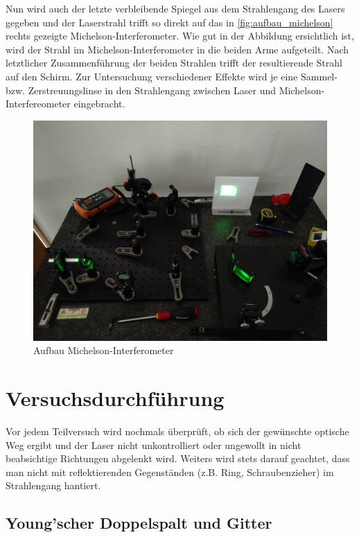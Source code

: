 \documentclass[ngerman]{scrartcl}
\begin{document}
Nun wird auch der letzte verbleibende Spiegel aus dem Strahlengang des Lasers gegeben und der Laserstrahl trifft so direkt auf das in \autoref{fig:aufbau_michelson} rechts gezeigte Michelson-Interferometer. Wie gut in der Abbildung ersichtlich ist, wird der Strahl im Michelson-Interferometer in die beiden Arme aufgeteilt. Nach letztlicher Zusammenführung der beiden Strahlen trifft der resultierende Strahl auf den Schirm.
Zur Untersuchung verschiedener Effekte wird je eine Sammel- bzw. Zerstreuungslinse in den Strahlengang zwischen Laser und Michelson-Interfereometer eingebracht.
%
\begin{figure}[H]
    \centering
    \begin{samepage}
        \includegraphics[width=0.7\linewidth]{fig/Compressed/aufbau_michelson.jpg}
        \caption{Aufbau Michelson-Interferometer}
        \label{fig:aufbau_michelson}
    \end{samepage}
\end{figure}



\section{Versuchsdurchführung}
\label{sec:durchfuehrung}

Vor jedem Teilversuch wird nochmals überprüft, ob sich der gewünschte optische Weg ergibt und der Laser nicht unkontrolliert oder ungewollt in nicht beabsichtige Richtungen abgelenkt wird. Weiters wird stets darauf geachtet, dass man nicht mit reflektierenden Gegenständen (z.B. Ring, Schraubenzieher) im Strahlengang hantiert.

\subsection{Young'scher Doppelspalt und Gitter}
\label{sec:durchfuehrung_doppelspalt_gitter}
\end{document}

